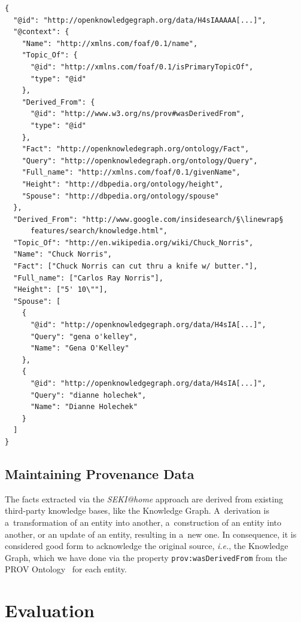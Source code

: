 \documentclass[runningheads,a4paper]{llncs}
\newcommand{\linewrap}{\raisebox{-.6ex}{\textcolor{grey}{$\hookleftarrow$}}}
\begin{document}
\begin{lstlisting}[caption=Subset of the meaningful JSON-LD from the Chuck Norris Knowledge Graph data. The mapping of the Knowledge Graph terms can be seen in the @context., label=code:jsonld, float=hbt!, escapechar=§, belowskip=-1em]
{
  "@id": "http://openknowledgegraph.org/data/H4sIAAAAA[...]",
  "@context": {
    "Name": "http://xmlns.com/foaf/0.1/name",
    "Topic_Of": {
      "@id": "http://xmlns.com/foaf/0.1/isPrimaryTopicOf",
      "type": "@id"
    },
    "Derived_From": {
      "@id": "http://www.w3.org/ns/prov#wasDerivedFrom",
      "type": "@id"
    },
    "Fact": "http://openknowledegraph.org/ontology/Fact",
    "Query": "http://openknowledegraph.org/ontology/Query",
    "Full_name": "http://xmlns.com/foaf/0.1/givenName",
    "Height": "http://dbpedia.org/ontology/height",
    "Spouse": "http://dbpedia.org/ontology/spouse"
  },
  "Derived_From": "http://www.google.com/insidesearch/§\linewrap§
      features/search/knowledge.html",
  "Topic_Of": "http://en.wikipedia.org/wiki/Chuck_Norris",
  "Name": "Chuck Norris",
  "Fact": ["Chuck Norris can cut thru a knife w/ butter."],
  "Full_name": ["Carlos Ray Norris"],
  "Height": ["5' 10\""],
  "Spouse": [
    {
      "@id": "http://openknowledgegraph.org/data/H4sIA[...]",
      "Query": "gena o'kelley",
      "Name": "Gena O'Kelley"
    },
    {
      "@id": "http://openknowledgegraph.org/data/H4sIA[...]",
      "Query": "dianne holechek",
      "Name": "Dianne Holechek"
    }
  ]
}
\end{lstlisting} 

\subsection{Maintaining Provenance Data}
The facts extracted via the \emph{SEKI@home} approach
are derived from existing third-party knowledge bases, like the Knowledge Graph.
A~derivation is a~transformation of an entity into another,
a~construction of an entity into another, or an update of an entity,
resulting in a~new one.
In consequence, it is considered good form to acknowledge the original source,
\emph{i.e.}, the Knowledge Graph,
which we have done via the property \texttt{prov:wasDerivedFrom}
from the PROV Ontology~\cite{lebo2012} for each entity.

\section{Evaluation} \label{sec:evaluation}
\end{document}
